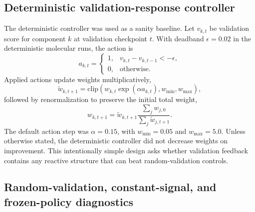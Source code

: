\documentclass[referee,lineno,pdflatex,sn-basic]{sn-jnl}
\theoremstyle{thmstyleone}%
\theoremstyle{thmstyletwo}%
\theoremstyle{thmstylethree}%
\begin{document}
\subsection{Deterministic validation-response controller}\label{subsec:deterministic}

The deterministic controller was used as a sanity baseline. Let $v_{k,t}$ be validation score for component $k$ at validation checkpoint $t$. With deadband $\epsilon=0.02$ in the deterministic molecular runs, the action is
\begin{equation}
a_{k,t} =
\begin{cases}
1, & v_{k,t} - v_{k,t-1} < -\epsilon,\\
0, & \mathrm{otherwise}.
\end{cases}
\label{eq:deterministic}
\end{equation}
Applied actions update weights multiplicatively,
\begin{equation}
\tilde{w}_{k,t+1}= \mathrm{clip}\left(w_{k,t}\exp(\alpha a_{k,t}), w_{\min}, w_{\max}\right),
\label{eq:weight_update}
\end{equation}
followed by renormalization to preserve the initial total weight,
\begin{equation}
w_{k,t+1}= \tilde{w}_{k,t+1}\frac{\sum_j w_{j,0}}{\sum_j \tilde{w}_{j,t+1}}.
\label{eq:renorm}
\end{equation}
The default action step was $\alpha=0.15$, with $w_{\min}=0.05$ and $w_{\max}=5.0$. Unless otherwise stated, the deterministic controller did not decrease weights on improvement. This intentionally simple design asks whether validation feedback contains any reactive structure that can beat random-validation controls.

\subsection{Random-validation, constant-signal, and frozen-policy diagnostics}\label{subsec:diagnostics}
\end{document}
